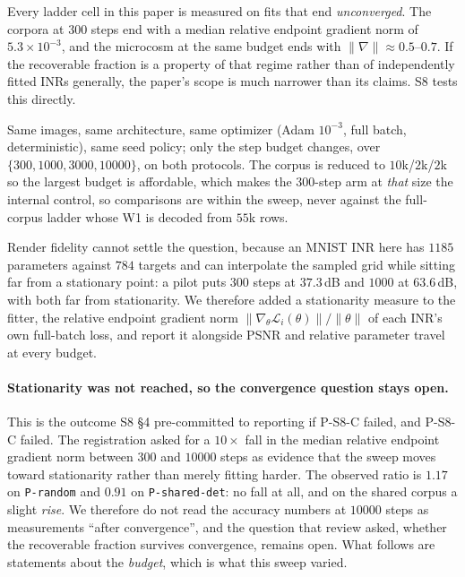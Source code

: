 Every ladder cell in this paper is measured on fits that end \emph{unconverged}. The corpora at
$300$ steps end with a median relative endpoint gradient norm of $5.3\times10^{-3}$, and the
microcosm at the same budget ends with $\|\nabla\|\approx0.5$--$0.7$. If the recoverable fraction is
a property of that regime rather than of independently fitted INRs generally, the paper's scope is
much narrower than its claims. S8 tests this directly.

Same images, same architecture, same optimizer (Adam $10^{-3}$, full batch, deterministic), same
seed policy; only the step budget changes, over $\{300, 1000, 3000, 10000\}$, on both protocols. The
corpus is reduced to $10$k/$2$k/$2$k so the largest budget is affordable, which makes the
$300$-step arm at \emph{that} size the internal control, so comparisons are within the sweep, never
against the full-corpus ladder whose W1 is decoded from $55$k rows.

Render fidelity cannot settle the question, because an MNIST INR here has $1185$ parameters against
$784$ targets and can interpolate the sampled grid while sitting far from a stationary point: a
pilot puts $300$ steps at $37.3$\,dB and $1000$ at $63.6$\,dB, with both far from stationarity. We
therefore added a stationarity measure to the fitter, the relative endpoint gradient norm
$\|\nabla_\theta \mathcal L_i(\theta)\|/\|\theta\|$ of each INR's own full-batch loss, and report it alongside PSNR and relative parameter travel at every budget.



\paragraph{Stationarity was not reached, so the convergence question stays open.} This is the outcome S8 §4 pre-committed to reporting if P-S8-C failed, and P-S8-C failed.
The registration asked for a $10\times$ fall in the median relative endpoint gradient norm between
$300$ and $10000$ steps as evidence that the sweep moves toward stationarity rather than merely
fitting harder. The observed ratio is $1.17$ on \texttt{P-random} and $0.91$ on
\texttt{P-shared-det}: no fall at all, and on the shared corpus a slight \emph{rise}. We therefore
do not read the accuracy numbers at $10000$ steps as measurements ``after convergence'', and the
question that review asked, whether the recoverable fraction survives convergence, remains
open. What follows are statements about the \emph{budget}, which is what this sweep varied.

